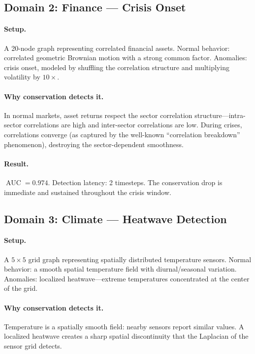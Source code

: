 \documentclass[11pt,a4paper]{article}
\DeclareMathOperator{\AUC}{AUC}
\begin{document}
\subsection{Domain 2: Finance --- Crisis Onset}

\paragraph{Setup.} A 20-node graph representing correlated financial assets.
Normal behavior: correlated geometric Brownian motion with a strong common
factor.  Anomalies: crisis onset, modeled by shuffling the correlation
structure and multiplying volatility by $10\times$.

\paragraph{Why conservation detects it.} In normal markets, asset returns
respect the sector correlation structure---intra-sector correlations are high
and inter-sector correlations are low.  During crises, correlations converge
(as captured by the well-known ``correlation breakdown'' phenomenon), destroying
the sector-dependent smoothness.

\paragraph{Result.} $\AUC = 0.974$.  Detection latency: 2 timesteps.  The
conservation drop is immediate and sustained throughout the crisis window.

\subsection{Domain 3: Climate --- Heatwave Detection}

\paragraph{Setup.} A $5 \times 5$ grid graph representing spatially distributed
temperature sensors.  Normal behavior: a smooth spatial temperature field with
diurnal/seasonal variation.  Anomalies: localized heatwave---extreme temperatures
concentrated at the center of the grid.

\paragraph{Why conservation detects it.} Temperature is a spatially smooth field:
nearby sensors report similar values.  A localized heatwave creates a sharp spatial
discontinuity that the Laplacian of the sensor grid detects.
\end{document}
